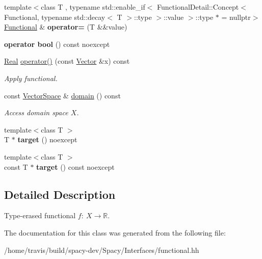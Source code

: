 \begin{DoxyCompactItemize}
\item 
\hypertarget{classSpacy_1_1Functional_a90fe7e1ba7e375f6bb8875b9e927a8d7}{{\footnotesize template$<$class T , typename std\-::enable\-\_\-if$<$ Functional\-Detail\-::\-Concept$<$ Functional, typename std\-::decay$<$ T $>$\-::type $>$\-::value $>$\-::type $\ast$  = nullptr$>$ }\\\hyperlink{classSpacy_1_1Functional}{Functional} \& {\bfseries operator=} (T \&\&value)}\label{classSpacy_1_1Functional_a90fe7e1ba7e375f6bb8875b9e927a8d7}

\item 
\hypertarget{classSpacy_1_1Functional_a9389924b8e141796b02879a26f37d7b0}{{\bfseries operator bool} () const noexcept}\label{classSpacy_1_1Functional_a9389924b8e141796b02879a26f37d7b0}

\item 
\hypertarget{classSpacy_1_1Functional_af51f903133f2fbf92cf12f790e429919}{\hyperlink{classSpacy_1_1Real}{Real} \hyperlink{classSpacy_1_1Functional_af51f903133f2fbf92cf12f790e429919}{operator()} (const \hyperlink{classSpacy_1_1Vector}{Vector} \&x) const }\label{classSpacy_1_1Functional_af51f903133f2fbf92cf12f790e429919}

\begin{DoxyCompactList}\small\item\em Apply functional. \end{DoxyCompactList}\item 
\hypertarget{classSpacy_1_1Functional_a6f4ada552c025579bcce852316a071be}{const \hyperlink{classSpacy_1_1VectorSpace}{Vector\-Space} \& \hyperlink{classSpacy_1_1Functional_a6f4ada552c025579bcce852316a071be}{domain} () const }\label{classSpacy_1_1Functional_a6f4ada552c025579bcce852316a071be}

\begin{DoxyCompactList}\small\item\em Access domain space $X$. \end{DoxyCompactList}\item 
\hypertarget{classSpacy_1_1Functional_a198a232d6aebbc15f7ab330b8294c8b4}{{\footnotesize template$<$class T $>$ }\\T $\ast$ {\bfseries target} () noexcept}\label{classSpacy_1_1Functional_a198a232d6aebbc15f7ab330b8294c8b4}

\item 
\hypertarget{classSpacy_1_1Functional_ab11a7ac418f216df78ff928893e10345}{{\footnotesize template$<$class T $>$ }\\const T $\ast$ {\bfseries target} () const noexcept}\label{classSpacy_1_1Functional_ab11a7ac418f216df78ff928893e10345}

\end{DoxyCompactItemize}


\subsection{Detailed Description}
Type-\/erased functional $f:\ X \to \mathbb{R} $. 

The documentation for this class was generated from the following file\-:\begin{DoxyCompactItemize}
\item 
/home/travis/build/spacy-\/dev/\-Spacy/\-Interfaces/functional.\-hh\end{DoxyCompactItemize}
